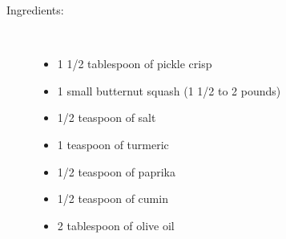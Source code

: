 \documentclass[11pt,letterpaper]{article}
\begin{document}
\begin{description}

\item[Ingredients:]\ \\
	\begin{itemize}
	\item 1 1/2 tablespoon of pickle crisp
	\item 1 small butternut squash (1 1/2 to 2 pounds)
	\item 1/2 teaspoon of salt
	\item 1 teaspoon of turmeric
	\item 1/2 teaspoon of paprika
	\item 1/2 teaspoon of cumin
	\item 2 tablespoon of olive oil
	\end{itemize}


\end{description}
\end{document}
